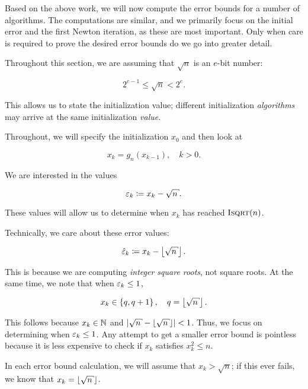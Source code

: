 Based on the above work, we will now compute the error bounds
for a number of algorithms.
The computations are similar,
and we primarily focus on the initial error and the first Newton iteration,
as these are most important.
Only when care is required to prove the desired
error bounds do we go into greater detail.

Throughout this section, we are assuming that $\sqrt{n}$ is an $e$-bit number:

\begin{equation}
    2^{e-1}\le \sqrt{n} < 2^{e}.
\end{equation}

\noindent
This allows us to state the initialization value;
different initialization \emph{algorithms} may arrive at the same
initialization \emph{value}.

Throughout, we will specify the initialization $x_{0}$
and then look at

\begin{equation}
    x_{k} = g_{n}(x_{k-1}), \quad k>0.
\end{equation}

\noindent
We are interested in the values

\begin{equation}
    \eps_{k} \mathDef{} x_{k} - \sqrt{n}.
\end{equation}

\noindent
These values will allow us to determine when $x_{k}$ has reached
$\textsc{Isqrt}(n)$.

Technically, we care about these error values:

\begin{equation}
    \hat{\eps}_{k} \mathDef{} x_{k} - \floor{\sqrt{n}}.
\end{equation}

\noindent
This is because we are computing \emph{integer square roots},
not square roots.
At the same time, we note that when $\varepsilon_{k}\le1$,

\begin{equation}
    x_{k}\in\braces{q, q+1}, \quad q=\floor{\sqrt{n}}.
\end{equation}

\noindent
This follows because $x_{k}\in\mathbb{N}$ and $\abs{\sqrt{n} - \floor{\sqrt{n}}} < 1$.
Thus, we focus on determining when $\varepsilon_{k}\le1$.
Any attempt to get a smaller error bound
is pointless because it is less expensive to check
if $x_{k}$ satisfies $x_{k}^{2} \le n$.

In each error bound calculation, we will assume that $x_{k} > \sqrt{n}$;
if this ever fails, we know that $x_{k} = \floor{\sqrt{n}}$.


